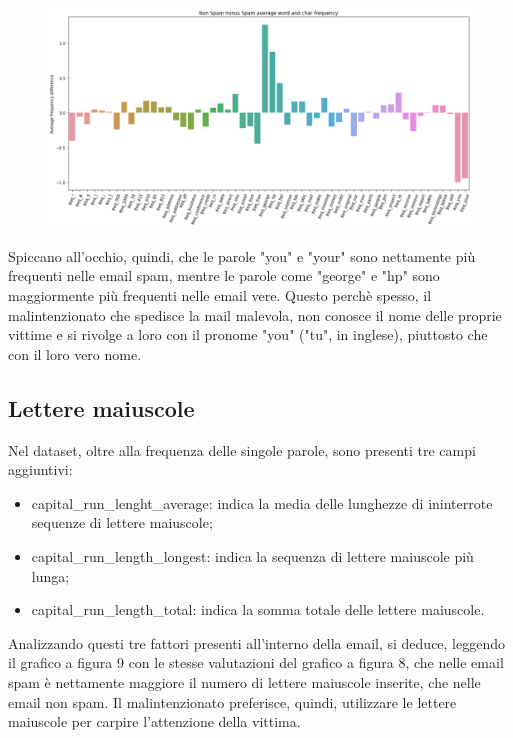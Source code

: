 \documentclass[12pt,a4paper]{article}
\begin{document}
\begin{figure}[H]
    \includegraphics[width=1\columnwidth]{df_difference_barplot.png}
    \caption{}
\end{figure}

Spiccano all'occhio, quindi, che le parole "you" e "your" sono nettamente più frequenti nelle email spam, mentre le parole come "george" e "hp" sono maggiormente più frequenti nelle email vere. Questo perchè spesso, il malintenzionato che spedisce la mail malevola, non conosce il nome delle proprie vittime e si rivolge a loro con il pronome "you" ("tu", in inglese), piuttosto che con il loro vero nome.
\subsection{Lettere maiuscole}
Nel dataset, oltre alla frequenza delle singole parole, sono presenti tre campi aggiuntivi:
\begin{itemize}
    \item capital\_run\_lenght\_average: indica la media delle lunghezze di ininterrote sequenze di lettere maiuscole;
    \item capital\_run\_length\_longest: indica la sequenza di lettere maiuscole più lunga;
    \item capital\_run\_length\_total: indica la somma totale delle lettere maiuscole.
\end{itemize}

Analizzando questi tre fattori presenti all'interno della email, si deduce, leggendo il grafico a figura 9 con le stesse valutazioni del grafico a figura 8, che nelle email spam è nettamente maggiore il numero di lettere maiuscole inserite, che nelle email non spam.
Il malintenzionato preferisce, quindi, utilizzare le lettere maiuscole per carpire l'attenzione della vittima.
\end{document}
